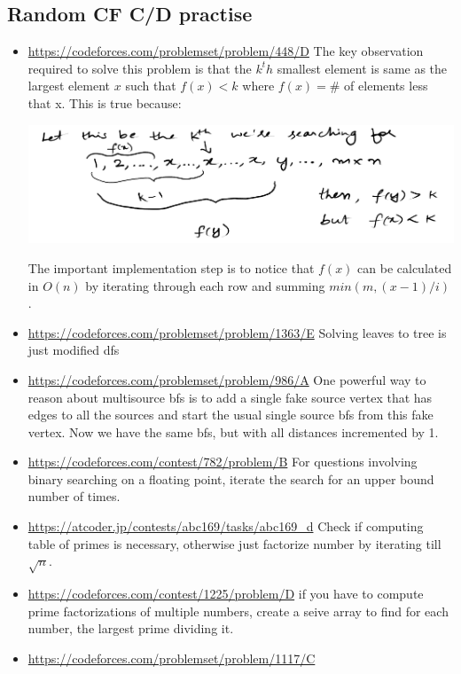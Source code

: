 \documentclass[titlepage, 12pt]{book}
\begin{document}
\subsection{Random CF C/D practise}
\begin{itemize}
  \item\url{https://codeforces.com/problemset/problem/448/D}
    The key observation required to solve this problem is that the $k^th$
    smallest element is same as the largest element $x$ such that $f(x) < k$
    where $f(x) = \#$ of elements less that x. This is true because:

    \includegraphics[scale=0.25]{cf448d}

    The important implementation step is to notice that $f(x)$ can be calculated
    in $O(n)$ by iterating through each row and summing $min(m, (x - 1) / i)$.
    
  \item\url{https://codeforces.com/problemset/problem/1363/E}
    Solving leaves to tree is just modified dfs

  \item\url{https://codeforces.com/problemset/problem/986/A}
    One powerful way to reason about multisource bfs is to add a single fake
    source vertex that has edges to all the sources and start the usual single
    source bfs from this fake vertex. Now we have the same bfs, but with all
    distances incremented by 1.

  \item\url{https://codeforces.com/contest/782/problem/B}
    For questions involving binary searching on a floating point, iterate the
    search for an upper bound number of times.

  \item\url{https://atcoder.jp/contests/abc169/tasks/abc169_d} Check if
    computing table of primes is necessary, otherwise just factorize number by
    iterating till $\sqrt{n}$.

  \item\url{https://codeforces.com/contest/1225/problem/D} if you have to
    compute prime factorizations of multiple numbers, create a seive array to
    find for each number, the largest prime dividing it.

  \item\url{https://codeforces.com/problemset/problem/1117/C}
    
\end{itemize}
\end{document}
